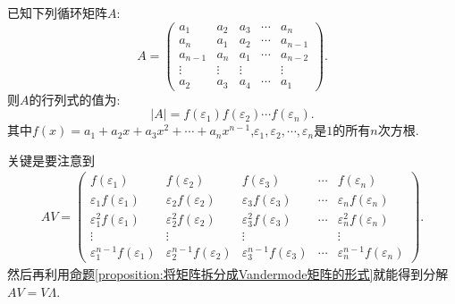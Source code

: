 \documentclass[../../main.tex]{subfiles}
\begin{document}
\begin{proposition}\label{proposition:循环行列式计算公式}
已知下列循环矩阵\(A\):
\[
A = 
\begin{pmatrix}
a_1 & a_2 & a_3 & \cdots & a_n\\
a_n & a_1 & a_2 & \cdots & a_{n - 1}\\
a_{n - 1} & a_n & a_1 & \cdots & a_{n - 2}\\
\vdots & \vdots & \vdots & & \vdots\\
a_2 & a_3 & a_4 & \cdots & a_1
\end{pmatrix}.
\]
则\(A\)的行列式的值为:
\[
|A| = f(\varepsilon_1)f(\varepsilon_2)\cdots f(\varepsilon_n).
\]
其中\(f(x)=a_1 + a_2x + a_3x^2+\cdots+a_nx^{n - 1}\),\(\varepsilon_1,\varepsilon_2,\cdots,\varepsilon_n\)是\(1\)的所有\(n\)次方根.
\end{proposition}
\begin{note}
关键是要注意到
\begin{align*}
AV = 
\begin{pmatrix}
f(\varepsilon_1) & f(\varepsilon_2) & f(\varepsilon_3) & \cdots & f(\varepsilon_n)\\
\varepsilon_1f(\varepsilon_1) & \varepsilon_2f(\varepsilon_2) & \varepsilon_3f(\varepsilon_3) & \cdots & \varepsilon_nf(\varepsilon_n)\\
\varepsilon_1^2f(\varepsilon_1) & \varepsilon_2^2f(\varepsilon_2) & \varepsilon_3^2f(\varepsilon_3) & \cdots & \varepsilon_n^2f(\varepsilon_n)\\
\vdots & \vdots & \vdots & & \vdots\\
\varepsilon_1^{n - 1}f(\varepsilon_1) & \varepsilon_2^{n - 1}f(\varepsilon_2) & \varepsilon_3^{n - 1}f(\varepsilon_3) & \cdots & \varepsilon_n^{n - 1}f(\varepsilon_n)
\end{pmatrix}.
\end{align*}
然后再利用\hyperref[proposition:将矩阵拆分成Vandermode矩阵的形式]{命题\ref{proposition:将矩阵拆分成Vandermode矩阵的形式}}就能得到分解$AV = V\Lambda$.
\end{note}
\end{document}
